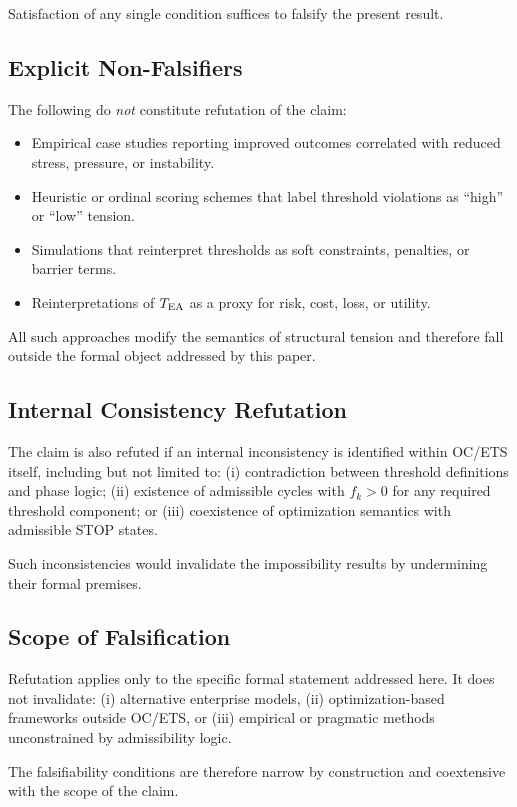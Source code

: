 Satisfaction of any single condition suffices to falsify the present
result.

\subsection{Explicit Non-Falsifiers}

The following do \emph{not} constitute refutation of the claim:

\begin{itemize}
  \item Empirical case studies reporting improved outcomes correlated
        with reduced stress, pressure, or instability.
  \item Heuristic or ordinal scoring schemes that label threshold
        violations as ``high'' or ``low'' tension.
  \item Simulations that reinterpret thresholds as soft constraints,
        penalties, or barrier terms.
  \item Reinterpretations of $T_{\mathrm{EA}}$ as a proxy for risk, cost, loss, or
        utility.
\end{itemize}

All such approaches modify the semantics of structural tension and
therefore fall outside the formal object addressed by this paper.

\subsection{Internal Consistency Refutation}

The claim is also refuted if an internal inconsistency is identified
within OC/ETS itself, including but not limited to:
(i) contradiction between threshold definitions and phase logic;
(ii) existence of admissible cycles with $f_k > 0$ for any required
threshold component; or
(iii) coexistence of optimization semantics with admissible STOP states.

Such inconsistencies would invalidate the impossibility results by
undermining their formal premises.

\subsection{Scope of Falsification}

Refutation applies only to the specific formal statement addressed here.
It does not invalidate:
(i) alternative enterprise models,
(ii) optimization-based frameworks outside OC/ETS, or
(iii) empirical or pragmatic methods unconstrained by admissibility
logic.

The falsifiability conditions are therefore narrow by construction and
coextensive with the scope of the claim.


